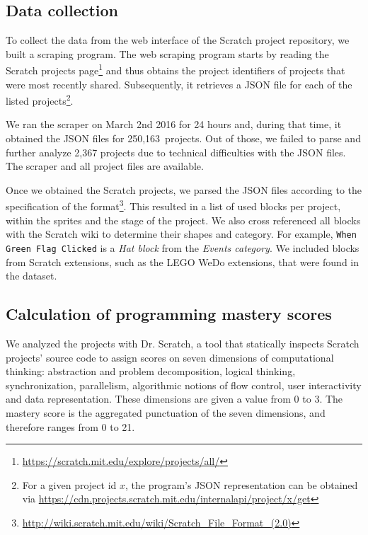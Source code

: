 \documentclass[10pt, conference]{IEEEtran}
\newcommand{\nPrograms}{250,163}
\newcommand{\fenia}[1]{\emph{\color{blue}Fenia says: #1}}
\begin{document}
\subsection{Data collection}
To collect the data from the web interface of the Scratch project repository, we built a scraping program.
The web scraping program starts by reading the Scratch projects page\footnote{\label{scratchpublic}\url{https://scratch.mit.edu/explore/projects/all/}} and thus obtains the project identifiers of projects that were most recently shared.
Subsequently, it retrieves a JSON file for each of the listed projects\footnote{For a given project id $x$, the program's JSON representation can be obtained via \url{https://cdn.projects.scratch.mit.edu/internalapi/project/x/get}}.

We ran the scraper on March 2nd 2016 for 24 hours and, during that time, it obtained the JSON files for \nPrograms~projects. Out of those, we failed to parse and further analyze 2,367 projects due to technical difficulties with the JSON files.
The scraper and all project files are available\footnotemark[\ref{dataseturl}].

Once we obtained the Scratch projects, we parsed the JSON files according to the specification of the format\footnote{\url{http://wiki.scratch.mit.edu/wiki/Scratch_File_Format_(2.0)}}.
This resulted in a list of used blocks per project, within the sprites and the stage of the project.
We also cross referenced all blocks with the Scratch wiki to determine their shapes and category.
For example, \texttt{When Green Flag Clicked} is a \emph{Hat block} from the \emph{Events category}.
We included blocks from Scratch extensions, such as the LEGO WeDo extensions, that were found in the dataset.

\subsection{Calculation of programming mastery scores}
We analyzed the projects with Dr. Scratch, a tool that statically inspects Scratch projects' source code to assign scores on seven dimensions of computational thinking: abstraction and problem decomposition, logical thinking, synchronization, parallelism, algorithmic notions of flow control, user interactivity and data representation. These dimensions are given a value from 0 to 3. The mastery score is the aggregated punctuation of the seven dimensions, and therefore ranges from 0 to 21.
\end{document}
